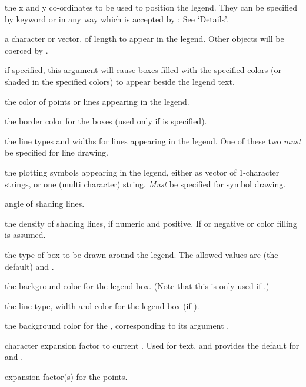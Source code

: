 \begin{Arguments}
\begin{ldescription}
\item[\code{x, y}] the x and y co-ordinates to be used to position the legend.
They can be specified by keyword or in any way which is accepted by
: See `Details'.
\item[\code{legend}] a character or  vector.
of length  to appear in the legend.  Other
objects will be coerced by .
\item[\code{fill}] if specified, this argument will cause boxes filled
with the specified colors (or shaded in the specified colors)
to appear beside the legend text.
\item[\code{col}] the color of points or lines appearing in the legend.
\item[\code{border}] the border color for the boxes (used only if
 is specified).
\item[\code{lty, lwd}] the line types and widths for lines appearing in the
legend.  One of these two \emph{must} be specified for line drawing.
\item[\code{pch}] the plotting symbols appearing in the legend, either as
vector of 1-character strings, or one (multi character)
string.  \emph{Must} be specified for symbol drawing.
\item[\code{angle}] angle of shading lines.
\item[\code{density}] the density of shading lines, if numeric and
positive. If  or negative or  color filling
is assumed.
\item[\code{bty}] the type of box to be drawn around the legend.  The allowed
values are  (the default) and .
\item[\code{bg}] the background color for the legend box.  (Note that this is
only used if .)
\item[\code{box.lty, box.lwd, box.col}] the line type, width and color for
the legend box (if ).
\item[\code{pt.bg}] the background color for the ,
corresponding to its argument .
\item[\code{cex}] character expansion factor  to current
.  Used for text, and provides the default for
 and .
\item[\code{pt.cex}] expansion factor(s) for the points.

\end{ldescription}
\end{Arguments}
